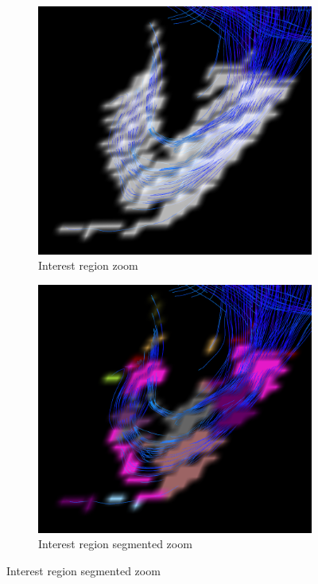 \documentclass[a4paper,11pt]{report}
\begin{document}
  \begin{figure}[H]
    \centering
    \begin{subfigure}[t]{.49\textwidth}
      \includegraphics[width=1\linewidth]{imgs/cc-expanded-fibers-mask-croped-zoomed.png}
      \caption{Interest region zoom}
      \label{subfig:fibres-mask-croped-zoomed}
    \end{subfigure}\hfill%
    \begin{subfigure}[t]{.49\textwidth}
      \includegraphics[width=1\linewidth]{imgs/cc-expanded-fibers-mask-croped-watersheds-zoomed.png}
      \caption{Interest region segmented zoom}
      \label{subfig:fibres-mask-croped-segmented-zoomed}
    \end{subfigure}\hfill
  \end{figure}
\end{document}
